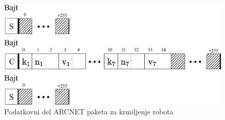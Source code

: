 \begin{figure}[!h]
	\centering
	\includegraphics[scale=0.5]{./Slike/arcnet-data.eps}
	\caption{Podatkovni del ARCNET paketa za krmiljenje robota}
	\label{fig:arcnet-data}
\end{figure}
